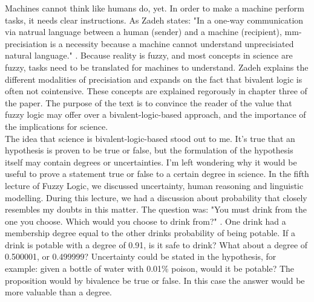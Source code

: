 


Machines cannot think like humans do, yet. In order to make a machine perform tasks, it needs clear instructions. As Zadeh states: "In a one-way communication via natrual language between a human (sender) and a machine (recipient), mm-precisiation is a necessity because a machine cannot understand unprecisiated natural language." \cite[2760]{is_there_a_need_for_fuzzy_logic}. Because reality is fuzzy, and most concepts in science are fuzzy, tasks need to be translated for machines to understand.
Zadeh explains the different modalities of precisiation and expands on the fact that bivalent logic is often not cointensive. These concepts are explained regorously in chapter three of the paper.
The purpose of the text is to convince the reader of the value that fuzzy logic may offer over a bivalent-logic-based approach, and the importance of the implications for science. \\

The idea that science is bivalent-logic-based stood out to me. It's true that an hypothesis is proven to be true or false, but the formulation of the hypothesis itself may contain degrees or uncertainties. I'm left wondering why it would be useful to prove a statement true or false to a certain degree in science.
In the fifth lecture of Fuzzy Logic, we discussed uncertainty, human reasoning and linguistic modelling. During this lecture, we had a discussion about probability that closely resembles my doubts in this matter. The question was: "You must drink from the one you choose. Which would you choose to drink from?" \cite[slide. 9]{lecture_5_uncertainty}. One drink had a membership degree equal to the other drinks probability of being potable. If a drink is potable with a degree of 0.91, is it safe to drink? What about a degree of 0.500001, or 0.499999? Uncertainty could be stated in the hypothesis, for example: given a bottle of water with 0.01\% poison, would it be potable? The proposition would by bivalence be true or false. In this case the answer would be more valuable than a degree. \\

